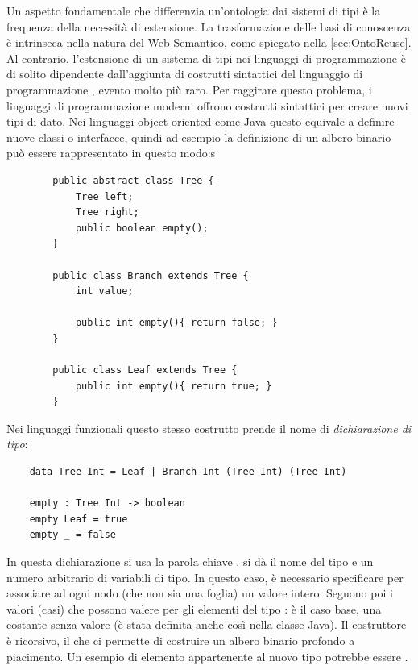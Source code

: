 Un aspetto fondamentale che differenzia un'ontologia dai sistemi di tipi è la frequenza della necessità di estensione. La trasformazione delle basi di conoscenza è intrinseca nella natura del Web Semantico, come spiegato nella \autoref{sec:OntoReuse}. Al contrario, l'estensione di un sistema di tipi nei linguaggi di programmazione è di solito dipendente dall'aggiunta di costrutti sintattici del linguaggio di programmazione \cite{pierceTypesBook}, evento molto più raro. Per raggirare questo problema, i linguaggi di programmazione moderni offrono costrutti sintattici per creare nuovi tipi di dato. Nei linguaggi object-oriented come Java questo equivale a definire nuove classi o interfacce, quindi ad esempio la definizione di un albero binario può essere rappresentato in questo modo:s
\begin{verbatim}
		public abstract class Tree {
			Tree left;
			Tree right;
			public boolean empty();
		}
		
		public class Branch extends Tree {
			int value;
		
			public int empty(){ return false; }
		}
		
		public class Leaf extends Tree {	
			public int empty(){ return true; }
		}
\end{verbatim}
Nei linguaggi funzionali questo stesso costrutto prende il nome di \textit{dichiarazione di tipo}:
\begin{verbatim}
	data Tree Int = Leaf | Branch Int (Tree Int) (Tree Int)
	
	empty : Tree Int -> boolean
	empty Leaf = true
	empty _ = false
\end{verbatim}
In questa dichiarazione si usa la parola chiave , si dà il nome del tipo e un numero arbitrario di variabili di tipo. In questo caso, è necessario specificare  per associare ad ogni nodo (che non sia una foglia) un valore intero. Seguono poi i valori (casi) che possono valere per gli elementi del tipo :  è il caso base, una costante senza valore (è stata definita anche così nella classe Java). Il costruttore  è ricorsivo, il che ci permette di costruire un albero binario profondo a piacimento. Un esempio di elemento appartenente al nuovo tipo  potrebbe essere .

